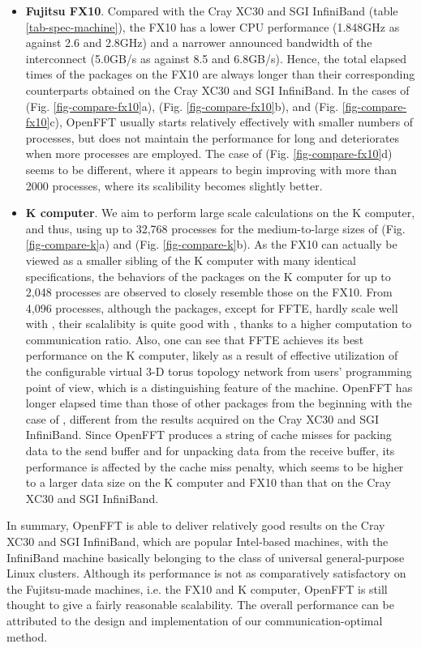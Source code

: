 \begin{itemize}
\item
\textbf{Fujitsu FX10}. Compared with the Cray XC30 and SGI InfiniBand (table \ref{tab-spec-machine}), the FX10 has a lower CPU performance (1.848GHz as against 2.6 and 2.8GHz) and a narrower announced bandwidth of the interconnect (5.0GB/s as against 8.5 and 6.8GB/s). Hence, the total elapsed times of the packages on the FX10 are always longer than their corresponding counterparts obtained on the Cray XC30 and SGI InfiniBand. In the cases of  (Fig. \ref{fig-compare-fx10}a),  (Fig. \ref{fig-compare-fx10}b), and  (Fig. \ref{fig-compare-fx10}c), OpenFFT usually starts relatively effectively with smaller numbers of processes, but does not maintain the performance for long and deteriorates when more processes are employed. The case of  (Fig. \ref{fig-compare-fx10}d) seems to be different, where it appears to begin improving with more than 2000 processes, where its scalibility becomes slightly better.   
\item
\textbf{K computer}. We aim to perform large scale calculations on the K computer, and thus, using up to 32,768 processes for the medium-to-large sizes of  (Fig. \ref{fig-compare-k}a) and  (Fig. \ref{fig-compare-k}b). As the FX10 can actually be viewed as a smaller sibling of the K computer with many identical specifications, the behaviors of the packages on the K computer for up to 2,048 processes are observed to closely resemble those on the FX10. From 4,096 processes, although the packages, except for FFTE, hardly scale well with , their scalalibity is quite good with , thanks to a higher computation to communication ratio. Also, one can see that FFTE achieves its best performance on the K computer, likely as a result of effective utilization of the configurable virtual 3-D torus topology network from users' programming point of view, which is a distinguishing feature of the machine. OpenFFT has longer elapsed time than those of other packages from the beginning with the case of , different from the results acquired on the Cray XC30 and SGI InfiniBand. Since OpenFFT produces a string of cache misses for packing data to the send buffer and for unpacking data from the receive buffer, its performance is affected by the cache miss penalty, which seems to be higher to a larger data size on the K computer and FX10 than that on the Cray XC30 and SGI InfiniBand. 
\end{itemize}

In summary, OpenFFT is able to deliver relatively good results on the Cray XC30 and SGI InfiniBand, which are popular Intel-based machines, with the InfiniBand machine basically belonging to the class of universal general-purpose Linux clusters. Although its performance is not as comparatively satisfactory on the Fujitsu-made machines, i.e. the FX10 and K computer, OpenFFT is still thought to give a fairly reasonable scalability. The overall performance can be attributed to the design and implementation of our communication-optimal method. 

